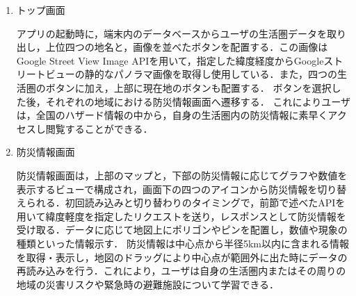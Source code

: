 \documentclass[a4paper]{jsarticle}
\begin{document}
\begin{enumerate}
  \item トップ画面

  アプリの起動時に，端末内のデータベースからユーザの生活圏データを取り出し，上位四つの地名と，画像を並べたボタンを配置する．この画像はGoogle Street View Image APIを用いて，指定した緯度経度からGoogleストリートビューの静的なパノラマ画像を取得し使用している．また，四つの生活圏のボタンに加え，上部に現在地のボタンも配置する．
  ボタンを選択した後，それぞれの地域における防災情報画面へ遷移する．
  これによりユーザは，全国のハザード情報の中から，自身の生活圏内の防災情報に素早くアクセスし閲覧することができる．

  \item 防災情報画面

  防災情報画面は，上部のマップと，下部の防災情報に応じてグラフや数値を表示するビューで構成され，画面下の四つのアイコンから防災情報を切り替えられる．初回読み込みと切り替わりのタイミングで，前節で述べたAPIを用いて緯度軽度を指定したリクエストを送り，レスポンスとして防災情報を受け取る．データに応じて地図上にポリゴンやピンを配置し，数値や現象の種類といった情報示す．
  防災情報は中心点から半径5km以内に含まれる情報を取得・表示し，地図のドラッグにより中心点が範囲外に出た時にデータの再読み込みを行う．これにより，ユーザは自身の生活圏内またはその周りの地域の災害リスクや緊急時の避難施設について学習できる．
\end{enumerate}
\end{document}
